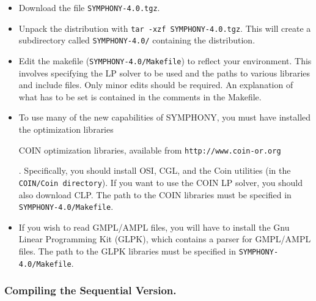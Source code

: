 \begin{itemize}

        \item Download the file {\tt SYMPHONY-4.0.tgz}.

        \item Unpack the distribution with {\tt tar -xzf
        SYMPHONY-4.0.tgz}. This will create a subdirectory called
        {\tt SYMPHONY-4.0/} containing the distribution.
        
        \item Edit the makefile ({\tt SYMPHONY-4.0/Makefile}) to reflect your
              environment. This involves specifying the LP solver to be used
              and the paths to various libraries and include files. Only minor
              edits should be required. An explanation of what has to be set
              is contained in the comments in the Makefile. 

        \item To use many of the new capabilities of SYMPHONY, you must have
	      installed the
	      optimization libraries \begin{latexonly} COIN optimization
	      libraries, available from \texttt{http://www.coin-or.org}
	      \end{latexonly}.  Specifically, you should install OSI, CGL, and
	      the Coin utilities (in the \texttt{COIN/Coin directory}). If you
	      want to use the COIN LP solver, you should also download CLP.
	      The path to the COIN libraries must be specified in
	      \texttt{SYMPHONY-4.0/Makefile}.

        \item If you wish to read GMPL/AMPL files, you will have to install
	      the Gnu Linear Programming Kit (GLPK), which contains a parser
	      for GMPL/AMPL files. The path to the GLPK libraries must be
	      specified in \texttt{SYMPHONY-4.0/Makefile}.

\end{itemize}
        
\subsubsection{Compiling the Sequential Version.}

